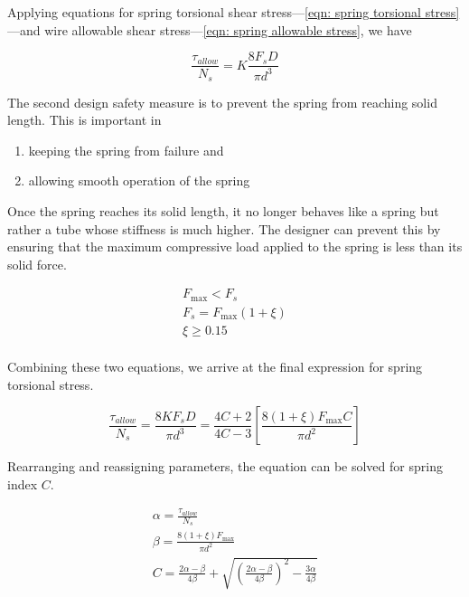 \documentclass[
10pt,
a4paper,
openany,
svgnames,
]{book}
\begin{document}
Applying equations for spring torsional shear stress—\cref{eqn: spring torsional stress}—and wire allowable shear stress—\cref{eqn: spring allowable stress}, we have

\begin{equation}
  \frac{\tau _{allow}}{N_s} = K\frac{8F_sD}{\pi d^3}
\end{equation}

The second design safety measure is to prevent the spring from reaching solid length. This is important in
\begin{enumerate}
\item keeping the spring from failure and
\item allowing smooth operation of the spring
\end{enumerate}
Once the spring reaches its solid length, it no longer behaves like a spring but rather a tube whose stiffness is much higher. The designer can prevent this by ensuring that the maximum compressive load applied to the spring is less than its solid force.

\begin{equation}
  \begin{gathered}
    F_{\max} < F_s \\ 
    F_s = F_{\max}(1 + \xi ) \\ 
    \xi  \geqslant 0.15 \\ 
  \end{gathered}
\end{equation}

Combining these two equations, we arrive at the final expression for spring torsional stress.

\[\frac{\tau _{allow}}{N_s} = \frac{8KF_sD}{\pi d^3} = \frac{4C + 2}{4C - 3}\left[ \frac{8(1 + \xi )F_{\max }C}{\pi d^2} \right]\]

Rearranging and reassigning parameters, the equation can be solved for spring index $C$.

\begin{equation}
  \begin{gathered}
    \alpha  = \frac{\tau_{allow}}{N_s} \\ 
    \beta  = \frac{8(1 + \xi )F_{\max}}{\pi d^2} \\ 
    C = \frac{2\alpha  - \beta }{4\beta} + \sqrt {\left( \frac{2\alpha  - \beta}{4\beta} \right)^2 - \frac{3\alpha}{4\beta}}  \\ 
  \end{gathered}
\end{equation}
\end{document}
